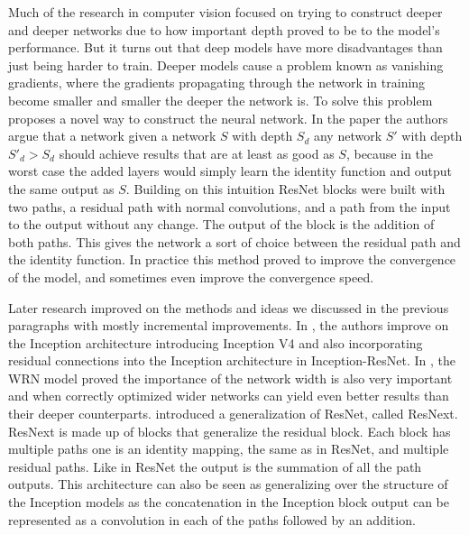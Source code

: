 \documentclass[../main.tex]{subfiles}
\begin{document}
Much of the research in computer vision focused on trying to construct deeper and deeper networks due to how important depth proved to be to the model's performance.
But it turns out that deep models have more disadvantages than just being harder to train. Deeper models cause a problem known as vanishing gradients,
where the gradients propagating through the network in training become smaller and smaller the deeper the network is.
To solve this problem \cite{resnet} proposes a novel way to construct the neural network. 
In the paper the authors argue that a network given a network $S$ with depth $S_d$ any network $S'$ with depth $S'_d > S_d$ should achieve results that are at least as 
good as $S$, because in the worst case the added layers would simply learn the identity function and output the same output as $S$.
Building on this intuition ResNet blocks were built with two paths, a residual path with normal convolutions, and a path from the input to the output without any change.
The output of the block is the addition of both paths. This gives the network a sort of choice between the residual path and the identity function.
In practice this method proved to improve the convergence of the model, and sometimes even improve the convergence speed.
\par

Later research improved on the methods and ideas we discussed in the previous paragraphs with mostly incremental improvements.
In \cite{inceptionv4}, the authors improve on the Inception architecture introducing Inception V4
and also incorporating residual connections into the Inception architecture in Inception-ResNet.
In \cite{wideresnet}, the WRN model proved the importance of the network width is also very important and when correctly optimized
wider networks can yield even better results than their deeper counterparts.
\cite{resnext} introduced a generalization of ResNet, called ResNext.
ResNext is made up of blocks that generalize the residual block. Each block has multiple paths one is an identity mapping,
the same as in ResNet, and multiple residual paths. Like in ResNet the output is the summation of all the path outputs.
This architecture can also be seen as generalizing over the structure of the Inception models as the concatenation in the Inception block output
can be represented as a convolution in each of the paths followed by an addition.
\par
\end{document}
